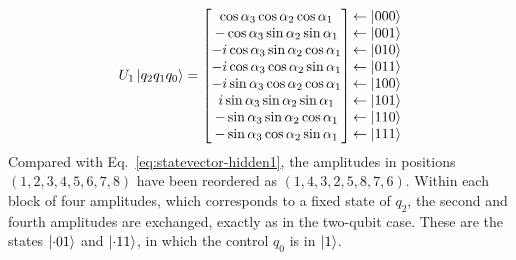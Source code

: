 \documentclass[12pt]{article}
\numberwithin{equation}{section}  %
\begin{document}
\begin{equation}
U_1 \ket{q_2 q_1 q_0} =
\begin{bmatrix}
\cos\alpha_3 \cos\alpha_2 \cos\alpha_1 \\
-\cos\alpha_3 \sin\alpha_2 \sin\alpha_1 \\
-i\cos\alpha_3 \sin\alpha_2 \cos\alpha_1 \\
-i\cos\alpha_3 \cos\alpha_2 \sin\alpha_1 \\
-i\sin\alpha_3 \cos\alpha_2 \cos\alpha_1 \\
i\sin\alpha_3 \sin\alpha_2 \sin\alpha_1 \\
-\sin\alpha_3 \sin\alpha_2 \cos\alpha_1 \\
-\sin\alpha_3 \cos\alpha_2 \sin\alpha_1
\end{bmatrix}
\begin{matrix} \leftarrow \ket{000} \\ \leftarrow \ket{001} \\ \leftarrow \ket{010} \\ \leftarrow \ket{011} \\ \leftarrow \ket{100} \\ \leftarrow \ket{101} \\ \leftarrow \ket{110} \\ \leftarrow \ket{111} \end{matrix}
\label{eq:cnot1}
\end{equation}
Compared with Eq.~\eqref{eq:statevector-hidden1}, the amplitudes in positions $(1, 2, 3, 4, 5, 6, 7, 8)$ have been reordered as $(1, 4, 3, 2, 5, 8, 7, 6)$. Within each block of four amplitudes, which corresponds to a fixed state of $q_2$, the second and fourth amplitudes are exchanged, exactly as in the two-qubit case. These are the states $\ket{\cdot 01}$ and $\ket{\cdot 11}$, in which the control $q_0$ is in $\ket{1}$.
\end{document}
